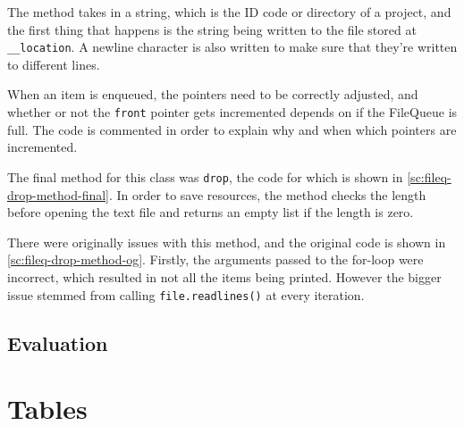 \documentclass[11pt]{article}
\begin{document}
            The method takes in a string, which is the ID code or directory of a project, and the first thing that happens is the string being written to the file stored at \verb|__location|. A newline character is also written to make sure that they're written to different lines. 

            When an item is enqueued, the pointers need to be correctly adjusted, and whether or not the \verb|front| pointer gets incremented depends on if the FileQueue is full. The code is commented in order to explain why and when which pointers are incremented. 

            \vspace{10pt}
            The final method for this class was \verb|drop|, the code for which is shown in \autoref{sc:fileq-drop-method-final}. In order to save resources, the method checks the length before opening the text file and returns an empty list if the length is zero. 

            There were originally issues with this method, and the original code is shown in \autoref{sc:fileq-drop-method-og}. Firstly, the arguments passed to the for-loop were incorrect, which resulted in not all the items being printed. However the bigger issue stemmed from calling \verb|file.readlines()| at every iteration. 





        \subsection{Evaluation}


    \newpage
    \appendix

    \newpage
    \section{Tables}
\end{document}
